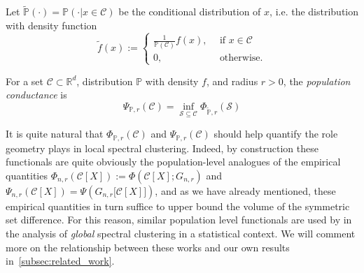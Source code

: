 \documentclass[11pt,twoside]{article}
\newcommand{\Reals}{\mathbb{R}}
\newcommand{\1}{\mathbf{1}}
\newcommand{\Rd}{\Reals^d}
\newcommand{\mc}[1]{\mathcal{#1}}
\newcommand{\Pbb}{\mathbb{P}}
\newcommand{\wt}[1]{\widetilde{#1}}
\begin{document}
Let $\wt{\mathbb{P}}(\cdot) = \mathbb{P}(\cdot|x \in \mc{C})$ be the conditional distribution of $x$, i.e. the distribution with density function
\begin{equation*}
\wt{f}(x) :=
\begin{cases*}
\frac{1}{\mathbb{P}(\mc{C})} f(x),~~ & \textrm{if $x \in \mc{C}$} \\
0,~~ & \textrm{otherwise.}
\end{cases*}
\end{equation*}

\begin{definition}
	For a set $\mc{C} \subset \Rd$, distribution $\Pbb$ with density $f$, and radius $r > 0$, the \emph{population conductance} is
	\begin{equation}
	\label{eqn:population_conductance}
	\Psi_{\mathbb{P},r}(\mc{C}) = \inf_{\mc{S} \subseteq \mc{C}} \Phi_{\wt{\Pbb},r}(\mc{S})
	\end{equation}
\end{definition}

It is quite natural that $\Phi_{\Pbb,r}(\mc{C})$ and $\Psi_{\Pbb,r}(\mc{C})$ should help quantify the role geometry plays in local spectral clustering. Indeed, by construction these functionals are quite obviously the population-level analogues of the empirical quantities $\Phi_{n,r}(\mc{C}[X]) := \Phi(\mc{C}[X];G_{n,r})$ and $\Psi_{n,r}(\mc{C}[X]) = \Psi(G_{n,r}\bigl[\mc{C}[X]\bigr])$, and as we have already mentioned, these empirical quantities in turn suffice to upper bound the volume of the symmetric set difference. For this reason, similar population level functionals are used by \citep{shi2009,schiebinger2015,garciatrillos19} in the analysis of \emph{global} spectral clustering in a statistical context. We will comment more on the relationship between these works and our own results in~\ref{subsec:related_work}.
\end{document}
